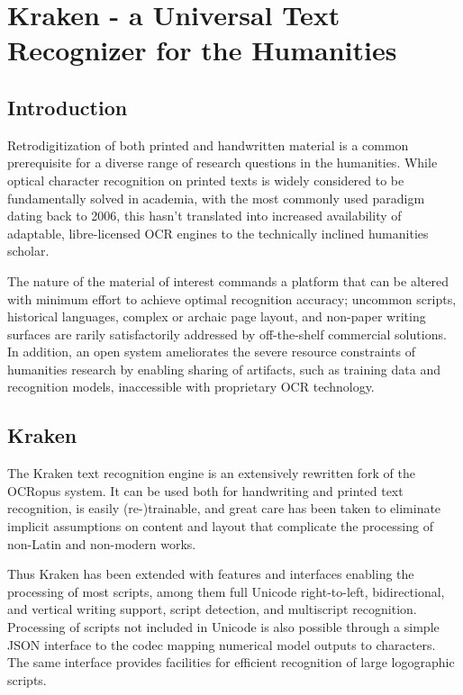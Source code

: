 \chapter{Kraken - a Universal Text Recognizer for the Humanities}

\section{Introduction}

Retrodigitization of both printed and handwritten material is a common
prerequisite for a diverse range of research questions in the humanities. While
optical character recognition on printed texts is widely considered to be
fundamentally solved in academia, with the most commonly used paradigm
\cite{graves2006connectionist} dating back to 2006, this hasn't translated into
increased availability of adaptable, libre-licensed OCR engines to the
technically inclined humanities scholar. 

The nature of the material of interest commands a platform that can be altered
with minimum effort to achieve optimal recognition accuracy; uncommon scripts,
historical languages, complex or archaic page layout, and non-paper writing
surfaces are rarily satisfactorily addressed by off-the-shelf commercial
solutions. In addition, an open system ameliorates the severe resource
constraints of humanities research by enabling sharing of artifacts, such as
training data and recognition models, inaccessible with proprietary OCR
technology.

\section{Kraken}

The Kraken text recognition engine is an extensively rewritten fork of the
OCRopus system. It can be used both for handwriting and printed text
recognition, is easily (re-)trainable, and great care has been taken to
eliminate implicit assumptions on content and layout that complicate the
processing of non-Latin and non-modern works.

Thus Kraken has been extended with features and interfaces enabling the
processing of most scripts, among them full Unicode right-to-left,
bidirectional, and vertical writing support, script detection, and multiscript
recognition. Processing of scripts not included in Unicode is also possible
through a simple JSON interface to the codec mapping numerical model outputs to
characters. The same interface provides facilities for efficient recognition of
large logographic scripts.


